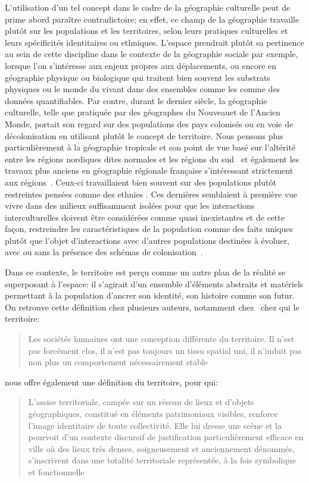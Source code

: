 L'utilisation d'un tel concept dans le cadre de la géographie culturelle peut de prime abord paraître contradictoire; en effet, ce champ de la géographie travaille plutôt sur les populations et les territoires, selon leurs pratiques culturelles et leurs spécificités identitaires ou ethniques. 
L'espace prendrait plutôt sa pertinence au sein de cette discipline dans le contexte de la géographie sociale par exemple, lorsque l'on s'intéresse aux enjeux propres aux déplacements, ou encore en géographie physique ou biologique qui traitent bien souvent les substrats physiques ou le monde du vivant dans des ensembles comme les  comme des données quantifiables. 
Par contre, durant le dernier siècle, la géographie culturelle, telle que pratiquée par des géographes du Nouveau\missref et de l'Ancien Monde\missref, portait son regard sur des populations des pays colonisés ou en voie de décolonisation en utilisant plutôt le concept de territoire. 
Nous pensons plus particulièrement à la géographie tropicale et son point de vue basé sur l'altérité entre les régions nordiques dites normales et les régions du sud~\citep[493]{Power2009} et également les travaux plus anciens en géographie régionale française s'intéressant strictement aux régions~\citep[31]{Courville1991}. 
Ceux-ci travaillaient bien souvent sur des populations plutôt restreintes pensées comme des ethnies .
Ces dernières semblaient à première vue vivre dans des milieux suffisamment isolées pour que les interactions interculturelles doivent être considérées comme quasi inexistantes et de cette façon, restreindre les caractéristiques de la population comme des faits uniques plutôt que l'objet d'interactions avec d'autres populations destinées à évoluer, avec ou sans la présence des schémas de colonisation~\citep[79--80]{DiMeo2007}.

Dans ce contexte, le territoire est perçu comme un autre plan de la réalité se superposant à l'espace: il s'agirait d'un ensemble d'éléments abstraits et matériels permettant à la population d'ancrer son identité, son histoire comme son futur. 
On retrouve cette définition chez plusieurs auteurs, notamment chez~\citeauthor{Bonnemaison1981} chez qui le territoire:
\blockquote[{\cite[253]{Bonnemaison1981}}][.]{Les sociétés humaines ont une conception différente du territoire. Il n'est pas forcément clos, il n'est pas toujours un tissu spatial uni, il n'induit pas non plus un comportement nécessairement stable}. 
\citeauthor{DiMeo2007} nous offre également une définition du territoire, pour qui:
\blockquote[{\cite[76]{DiMeo2007}}][.]{L’assise territoriale, campée sur un réseau de lieux et d’objets géographiques, constitué en éléments patrimoniaux visibles, renforce l’image identitaire de toute collectivité. Elle lui dresse une scène et la pourvoit d’un contexte discursif de justification particulièrement efficace en ville où des lieux très denses, soigneusement et anciennement dénommés, s’inscrivent dans une totalité territoriale représentée, à la fois symbolique et fonctionnelle}. 

